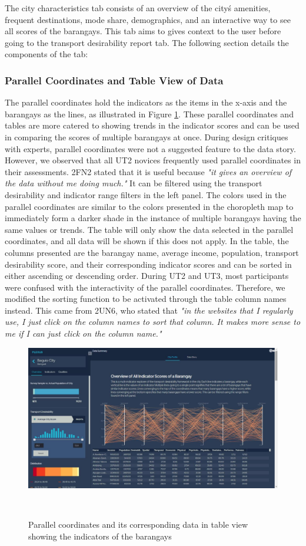 \documentclass{sigchi}
\begin{document}
The city characteristics tab consists of an overview of the city\'s amenities, frequent destinations, mode share, demographics, and an interactive way to see all scores of the barangays. This tab aims to gives context to the user before going to the transport desirability report tab. The following section details the components of the tab:


\subsubsection{Parallel Coordinates and Table View of Data}
The parallel coordinates hold the indicators as the items in the x-axis and the barangays as the lines, as illustrated in Figure \ref{fig:KeplerParallelCoords}. These parallel coordinates and tables are more catered to showing trends in the indicator scores and can be used in comparing the scores of multiple barangays at once. During design critiques with experts, parallel coordinates were not a suggested feature to the data story. However, we observed that all UT2 novices frequently used parallel coordinates in their assessments. 2FN2 stated that it is useful because \textit{"it gives an overview of the data without me doing much."} It can be filtered using the transport desirability and indicator range filters in the left panel. The colors used in the parallel coordinates are similar to the colors presented in the choropleth map to immediately form a darker shade in the instance of multiple barangays having the same values or trends. The table will only show the data selected in the parallel coordinates, and all data will be shown if this does not apply. In the table, the columns presented are the barangay name, average income, population, transport desirability score, and their corresponding indicator scores and can be sorted in either ascending or descending order. During UT2 and UT3, most participants were confused with the interactivity of the parallel coordinates. Therefore, we modified the sorting function to be activated through the table column names instead. This came from 2UN6, who stated that \textit{"in the websites that I regularly use, I just click on the column names to sort that column. It makes more sense to me if I can just click on the column name."}

\begin{figure}
\centering
  \includegraphics[width=0.9\columnwidth]{figures/latest-screens/pcords.jpg}
  \caption{Parallel coordinates and its corresponding data in table view showing the indicators of the barangays}~\label{fig:KeplerParallelCoords}
\end{figure}
\end{document}
